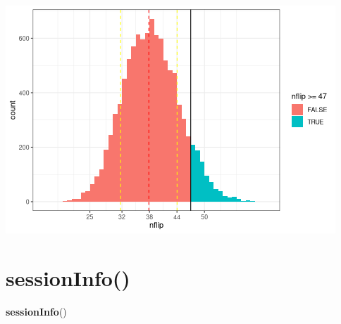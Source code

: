 \documentclass[
  10pt,
]{article}
\newenvironment{Shaded}{\begin{snugshade}}{\end{snugshade}}
\newcommand{\FunctionTok}[1]{\textcolor[rgb]{0.13,0.29,0.53}{\textbf{#1}}}
\newcommand{\NormalTok}[1]{#1}
\begin{document}
\includegraphics{05.pvalues_files/figure-latex/unnamed-chunk-9-1.png}

\newpage

\hypertarget{sessioninfo}{%
\section{sessionInfo()}\label{sessioninfo}}

\begin{Shaded}
\begin{Highlighting}[]
\FunctionTok{sessionInfo}\NormalTok{()}
\end{Highlighting}
\end{Shaded}
\end{document}
